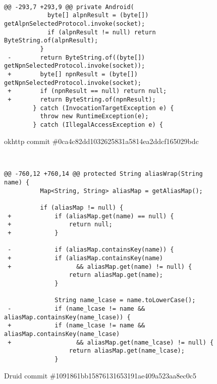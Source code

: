 
\begin{figure*}
\begin{lstlisting}

@@ -293,7 +293,9 @@ private Android(
            byte[] alpnResult = (byte[]) getAlpnSelectedProtocol.invoke(socket);
            if (alpnResult != null) return ByteString.of(alpnResult);
          }
 -        return ByteString.of((byte[]) getNpnSelectedProtocol.invoke(socket));
 +        byte[] npnResult = (byte[]) getNpnSelectedProtocol.invoke(socket);
 +        if (npnResult == null) return null;
 +        return ByteString.of(npnResult);
        } catch (InvocationTargetException e) {
          throw new RuntimeException(e);
        } catch (IllegalAccessException e) {
\end{lstlisting}
\caption{okhttp commit \#0ca4c82dd1032625831a5814ea2ddcf165029bdc\label{fig:null2}}
\end{figure*}


\begin{figure*}
\begin{lstlisting}


@@ -760,12 +760,14 @@ protected String aliasWrap(String name) {
          Map<String, String> aliasMap = getAliasMap();
  
          if (aliasMap != null) {
 +            if (aliasMap.get(name) == null) {
 +                return null;
 +            }

 -            if (aliasMap.containsKey(name)) {
 +            if (aliasMap.containsKey(name)
 +            		&& aliasMap.get(name) != null) {
                  return aliasMap.get(name);
              }
              
              String name_lcase = name.toLowerCase();
 -            if (name_lcase != name && aliasMap.containsKey(name_lcase)) {
 +            if (name_lcase != name && aliasMap.containsKey(name_lcase)
 +            		&& aliasMap.get(name_lcase) != null) {
                  return aliasMap.get(name_lcase);
              }

\end{lstlisting}
\caption{Druid commit \#1091861bb15876131653191ae409a523aa8ec0c5\label{fig:null1}}
\end{figure*}

